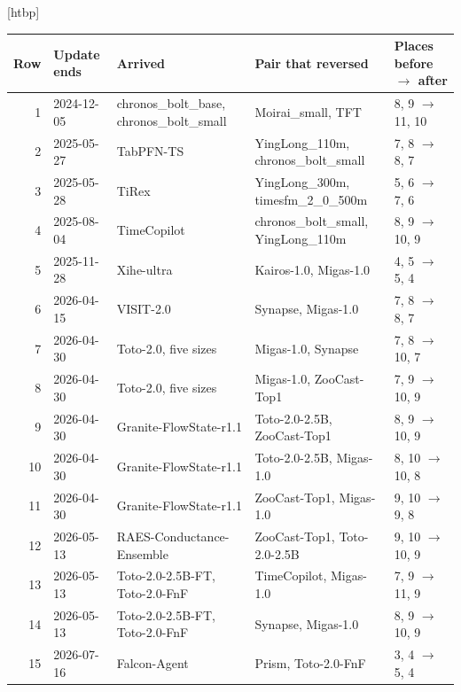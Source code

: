 \documentclass{article}
\makeatletter
\renewenvironment{table}
  {\setlength{\abovecaptionskip}{6\p@}%
   \setlength{\belowcaptionskip}{\z@}%
   \@float{table}}
  {\end@float}
\makeatother
\begin{document}
\begin{table}[htbp]
\centering
\scriptsize
\setlength{\tabcolsep}{4pt}
\begin{tabular}{@{}rlp{3.9cm}p{4.3cm}l@{}}
\toprule
Row & Update ends & Arrived & Pair that reversed & Places before $\to$ after \\
\midrule
1 & 2024-12-05 & \raggedright chronos\_bolt\_base, chronos\_bolt\_small & \raggedright Moirai\_small, TFT & 8, 9 $\to$ 11, 10 \\
2 & 2025-05-27 & \raggedright TabPFN-TS & \raggedright YingLong\_110m, chronos\_bolt\_small & 7, 8 $\to$ 8, 7 \\
3 & 2025-05-28 & \raggedright TiRex & \raggedright YingLong\_300m, timesfm\_2\_0\_500m & 5, 6 $\to$ 7, 6 \\
4 & 2025-08-04 & \raggedright TimeCopilot & \raggedright chronos\_bolt\_small, YingLong\_110m & 8, 9 $\to$ 10, 9 \\
5 & 2025-11-28 & \raggedright Xihe-ultra & \raggedright Kairos-1.0, Migas-1.0 & 4, 5 $\to$ 5, 4 \\
6 & 2026-04-15 & \raggedright VISIT-2.0 & \raggedright Synapse, Migas-1.0 & 7, 8 $\to$ 8, 7 \\
7 & 2026-04-30 & \raggedright Toto-2.0, five sizes & \raggedright Migas-1.0, Synapse & 7, 8 $\to$ 10, 7 \\
8 & 2026-04-30 & \raggedright Toto-2.0, five sizes & \raggedright Migas-1.0, ZooCast-Top1 & 7, 9 $\to$ 10, 9 \\
9 & 2026-04-30 & \raggedright Granite-FlowState-r1.1 & \raggedright Toto-2.0-2.5B, ZooCast-Top1 & 8, 9 $\to$ 10, 9 \\
10 & 2026-04-30 & \raggedright Granite-FlowState-r1.1 & \raggedright Toto-2.0-2.5B, Migas-1.0 & 8, 10 $\to$ 10, 8 \\
11 & 2026-04-30 & \raggedright Granite-FlowState-r1.1 & \raggedright ZooCast-Top1, Migas-1.0 & 9, 10 $\to$ 9, 8 \\
12 & 2026-05-13 & \raggedright RAES-Conductance-Ensemble & \raggedright ZooCast-Top1, Toto-2.0-2.5B & 9, 10 $\to$ 10, 9 \\
13 & 2026-05-13 & \raggedright Toto-2.0-2.5B-FT, Toto-2.0-FnF & \raggedright TimeCopilot, Migas-1.0 & 7, 9 $\to$ 11, 9 \\
14 & 2026-05-13 & \raggedright Toto-2.0-2.5B-FT, Toto-2.0-FnF & \raggedright Synapse, Migas-1.0 & 8, 9 $\to$ 10, 9 \\
15 & 2026-07-16 & \raggedright Falcon-Agent & \raggedright Prism, Toto-2.0-FnF & 3, 4 $\to$ 5, 4 \\

\end{tabular}
\end{table}
\end{document}
